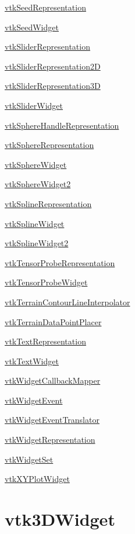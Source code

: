 \begin{DoxyItemize}
\item \hyperlink{vtkwidgets_vtkseedrepresentation}{vtk\-Seed\-Representation}  
\item \hyperlink{vtkwidgets_vtkseedwidget}{vtk\-Seed\-Widget}  
\item \hyperlink{vtkwidgets_vtksliderrepresentation}{vtk\-Slider\-Representation}  
\item \hyperlink{vtkwidgets_vtksliderrepresentation2d}{vtk\-Slider\-Representation2\-D}  
\item \hyperlink{vtkwidgets_vtksliderrepresentation3d}{vtk\-Slider\-Representation3\-D}  
\item \hyperlink{vtkwidgets_vtksliderwidget}{vtk\-Slider\-Widget}  
\item \hyperlink{vtkwidgets_vtkspherehandlerepresentation}{vtk\-Sphere\-Handle\-Representation}  
\item \hyperlink{vtkwidgets_vtksphererepresentation}{vtk\-Sphere\-Representation}  
\item \hyperlink{vtkwidgets_vtkspherewidget}{vtk\-Sphere\-Widget}  
\item \hyperlink{vtkwidgets_vtkspherewidget2}{vtk\-Sphere\-Widget2}  
\item \hyperlink{vtkwidgets_vtksplinerepresentation}{vtk\-Spline\-Representation}  
\item \hyperlink{vtkwidgets_vtksplinewidget}{vtk\-Spline\-Widget}  
\item \hyperlink{vtkwidgets_vtksplinewidget2}{vtk\-Spline\-Widget2}  
\item \hyperlink{vtkwidgets_vtktensorproberepresentation}{vtk\-Tensor\-Probe\-Representation}  
\item \hyperlink{vtkwidgets_vtktensorprobewidget}{vtk\-Tensor\-Probe\-Widget}  
\item \hyperlink{vtkwidgets_vtkterraincontourlineinterpolator}{vtk\-Terrain\-Contour\-Line\-Interpolator}  
\item \hyperlink{vtkwidgets_vtkterraindatapointplacer}{vtk\-Terrain\-Data\-Point\-Placer}  
\item \hyperlink{vtkwidgets_vtktextrepresentation}{vtk\-Text\-Representation}  
\item \hyperlink{vtkwidgets_vtktextwidget}{vtk\-Text\-Widget}  
\item \hyperlink{vtkwidgets_vtkwidgetcallbackmapper}{vtk\-Widget\-Callback\-Mapper}  
\item \hyperlink{vtkwidgets_vtkwidgetevent}{vtk\-Widget\-Event}  
\item \hyperlink{vtkwidgets_vtkwidgeteventtranslator}{vtk\-Widget\-Event\-Translator}  
\item \hyperlink{vtkwidgets_vtkwidgetrepresentation}{vtk\-Widget\-Representation}  
\item \hyperlink{vtkwidgets_vtkwidgetset}{vtk\-Widget\-Set}  
\item \hyperlink{vtkwidgets_vtkxyplotwidget}{vtk\-X\-Y\-Plot\-Widget}  
\end{DoxyItemize}\hypertarget{vtkwidgets_vtk3dwidget}{}\section{vtk3\-D\-Widget}\label{vtkwidgets_vtk3dwidget}
